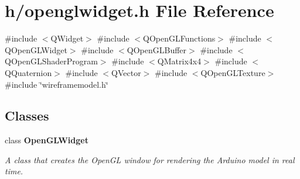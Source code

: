 \section{h/openglwidget.h File Reference}
\label{openglwidget_8h}
{\ttfamily \#include $<$Q\+Widget$>$}\newline
{\ttfamily \#include $<$Q\+Open\+G\+L\+Functions$>$}\newline
{\ttfamily \#include $<$Q\+Open\+G\+L\+Widget$>$}\newline
{\ttfamily \#include $<$Q\+Open\+G\+L\+Buffer$>$}\newline
{\ttfamily \#include $<$Q\+Open\+G\+L\+Shader\+Program$>$}\newline
{\ttfamily \#include $<$Q\+Matrix4x4$>$}\newline
{\ttfamily \#include $<$Q\+Quaternion$>$}\newline
{\ttfamily \#include $<$Q\+Vector$>$}\newline
{\ttfamily \#include $<$Q\+Open\+G\+L\+Texture$>$}\newline
{\ttfamily \#include \char`\"{}wireframemodel.\+h\char`\"{}}\newline
\subsection*{Classes}
\begin{DoxyCompactItemize}
\item 
class \textbf{ Open\+G\+L\+Widget}
\begin{DoxyCompactList}\small\item\em A class that creates the Open\+GL window for rendering the Arduino model in real time. \end{DoxyCompactList}\end{DoxyCompactItemize}

